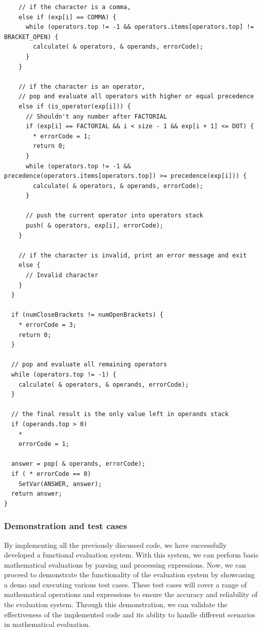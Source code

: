 \documentclass[a4paper, twoside]{report}
\begin{document}
\begin{verbatim}
    // if the character is a comma,
    else if (exp[i] == COMMA) {
      while (operators.top != -1 && operators.items[operators.top] != BRACKET_OPEN) {
        calculate( & operators, & operands, errorCode);
      }
    }

    // if the character is an operator,
    // pop and evaluate all operators with higher or equal precedence
    else if (is_operator(exp[i])) {
      // Shouldn't any number after FACTORIAL
      if (exp[i] == FACTORIAL && i < size - 1 && exp[i + 1] <= DOT) {
        * errorCode = 1;
        return 0;
      }
      while (operators.top != -1 && precedence(operators.items[operators.top]) >= precedence(exp[i])) {
        calculate( & operators, & operands, errorCode);
      }

      // push the current operator into operators stack
      push( & operators, exp[i], errorCode);
    }

    // if the character is invalid, print an error message and exit
    else {
      // Invalid character
    }
  }

  if (numCloseBrackets != numOpenBrackets) {
    * errorCode = 3;
    return 0;
  }

  // pop and evaluate all remaining operators
  while (operators.top != -1) {
    calculate( & operators, & operands, errorCode);
  }

  // the final result is the only value left in operands stack
  if (operands.top > 0)
    *
    errorCode = 1;

  answer = pop( & operands, errorCode);
  if ( * errorCode == 0)
    SetVar(ANSWER, answer);
  return answer;
}
\end{verbatim}

\subsubsection{Demonstration and test cases}
By implementing all the previously discussed code, we have successfully developed a functional evaluation system. With this system, we can perform basic mathematical evaluations by parsing and processing expressions. Now, we can proceed to demonstrate the functionality of the evaluation system by showcasing a demo and executing various test cases. These test cases will cover a range of mathematical operations and expressions to ensure the accuracy and reliability of the evaluation system. Through this demonstration, we can validate the effectiveness of the implemented code and its ability to handle different scenarios in mathematical evaluation.
\end{document}
